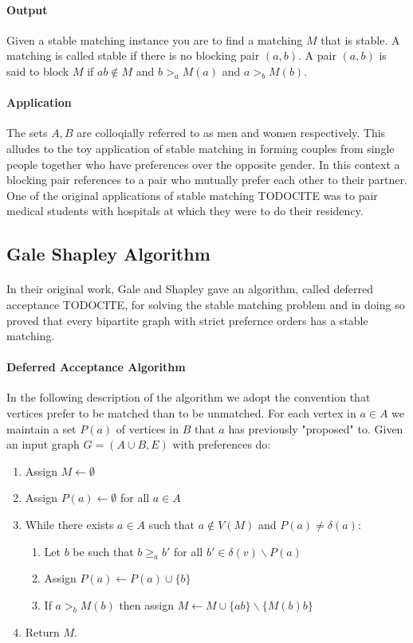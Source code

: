 \paragraph{Output} Given a stable matching instance you are to find a matching $M$ that is stable. A matching is called stable if there is no blocking pair $(a,b)$. A pair $(a,b)$ is said to block $M$ if $ab \not\in M$ and $b >_a M(a)$ and $a >_b M(b)$.
\paragraph{Application} The sets $A,B$ are colloqially referred to as men and women respectively. This alludes to the toy application of stable matching in forming couples from single people together who have preferences over the opposite gender. In this context a blocking pair references to a pair who mutually prefer each other to their partner. One of the original applications of stable matching TODOCITE was to pair medical students with hospitals at which they were to do their residency.
\subsection{Gale Shapley Algorithm}
\paragraph{}
In their original work, Gale and Shapley gave an algorithm, called deferred acceptance TODOCITE, for solving the stable matching problem and in doing so proved that every bipartite graph with strict prefernce orders has a stable matching.
\paragraph{Deferred Acceptance Algorithm}
In the following description of the algorithm we adopt the convention that vertices prefer to be matched than to be unmatched. For each vertex in $a\in A$ we maintain a set $P(a)$ of vertices in $B$ that $a$ has previously "proposed" to. Given an input graph $G=(A \cup B, E)$ with preferences do:
\begin{enumerate}
\item Assign $M \leftarrow \emptyset$
\item Assign $P(a) \leftarrow \emptyset$ for all $a \in A$
\item While there exists $a \in A$ such that $a \not\in V(M)$ and $P(a) \neq \delta(a)$:
	\begin{enumerate}
	\item Let $b$ be such that $b \geq_a b'$ for all $b' \in \delta(v) \backslash P(a)$
	\item Assign $P(a) \leftarrow P(a) \cup \{b\}$
	\item If $a >_b M(b)$ then assign $M \leftarrow M \cup \{ab\} \backslash \{M(b)b\}$
	\end{enumerate}
\item Return $M$.
\end{enumerate}
